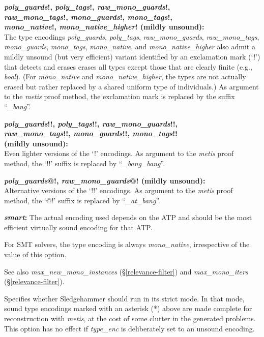 \documentclass[a4paper,12pt]{article}
\begin{document}
\begin{enum}
\begin{enum}
\item[\labelitemi]
\textbf{%
\textit{poly\_guards}!, \textit{poly\_tags}!, \textit{raw\_mono\_guards}!, \\
\textit{raw\_mono\_tags}!, \textit{mono\_guards}!, \textit{mono\_tags}!, \\
\textit{mono\_native}!, \textit{mono\_native\_higher}! (mildly unsound):} \\
The type encodings \textit{poly\_guards}, \textit{poly\_tags},
\textit{raw\_mono\_guards}, \textit{raw\_mono\_tags}, \textit{mono\_guards},
\textit{mono\_tags}, \textit{mono\_native}, and \textit{mono\_native\_higher}
also admit a mildly unsound (but very efficient) variant identified by an
exclamation mark (`\hbox{!}') that detects and erases erases all types except
those that are clearly finite (e.g., \textit{bool}). (For \textit{mono\_native}
and \textit{mono\_native\_higher}, the types are not actually erased but rather
replaced by a shared uniform type of individuals.) As argument to the
\textit{metis} proof method, the exclamation mark is replaced by the suffix
\hbox{``\textit{\_bang\/}''}.

\item[\labelitemi]
\textbf{%
\textit{poly\_guards}!!, \textit{poly\_tags}!!, \textit{raw\_mono\_guards}!!, \\
\textit{raw\_mono\_tags}!!, \textit{mono\_guards}!!, \textit{mono\_tags}!! \\
(mildly unsound):} \\
Even lighter versions of the `\hbox{!}' encodings. As argument to the
\textit{metis} proof method, the `\hbox{!!}' suffix is replaced by
\hbox{``\textit{\_bang\_bang\/}''}.

\item[\labelitemi]
\textbf{%
\textit{poly\_guards}@!, \textit{raw\_mono\_guards}@! (mildly unsound):} \\
Alternative versions of the `\hbox{!!}' encodings. As argument to the
\textit{metis} proof method, the `\hbox{@!}' suffix is replaced by
\hbox{``\textit{\_at\_bang\/}''}.

\item[\labelitemi] \textbf{\textit{smart}:} The actual encoding used depends on
the ATP and should be the most efficient virtually sound encoding for that ATP.
\end{enum}

For SMT solvers, the type encoding is always \textit{mono\_native}, irrespective
of the value of this option.

\nopagebreak
{\small See also \textit{max\_new\_mono\_instances} (\S\ref{relevance-filter})
and \textit{max\_mono\_iters} (\S\ref{relevance-filter}).}

Specifies whether Sledgehammer should run in its strict mode. In that mode,
sound type encodings marked with an asterisk (*) above are made complete
for reconstruction with \textit{metis}, at the cost of some clutter in the
generated problems. This option has no effect if \textit{type\_enc} is
deliberately set to an unsound encoding.
\end{enum}
\end{document}
